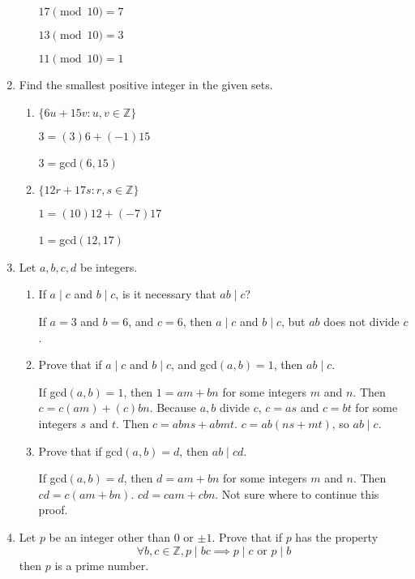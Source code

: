 \documentclass{article}
\begin{document}
\begin{enumerate}
\begin{enumerate}
        $17 \pmod 10 = 7$

        $13 \pmod 10 = 3$

        $11 \pmod 10 = 1$

    \end{enumerate}

    \item Find the smallest positive integer in the given sets.
    \begin{enumerate}
        \item $\{ 6u + 15v \colon u,v\in\mathbb{Z} \}$
        
        $3 = (3)6 + (-1)15$
        
        $3 = $gcd$(6,15)$
        \item $\{ 12r + 17s \colon r,s\in\mathbb{Z} \}$
        
        $1 = (10)12 + (-7)17$

        $1 = $gcd$(12,17)$
    \end{enumerate}
    

    \item Let $a,b,c,d$ be integers.
    \begin{enumerate}
        \item If $a\mid c$ and $b\mid c$, is it necessary that $ab\mid c$? 
        
        If $a = 3$ and $b = 6$, and $c = 6$, then $a\mid c$ and $b\mid c$, but $ab$ does not divide $c$.

        \item Prove that if $a\mid c$ and $b\mid c$, and gcd$(a,b) = 1$, then $ab\mid c$.
        
        If gcd$(a,b) = 1$, then $1 = am + bn$ for some integers $m$ and $n$. Then $c = c(am) + (c)bn$.
        Because $a,b$ divide $c$, $c = as$ and $c = bt$ for some integers $s$ and $t$. Then $c = abns + abmt$. $c = ab(ns+mt)$, so $ab\mid c$.

        \item Prove that if gcd$(a,b) = d$, then $ab\mid cd$.
        
        If gcd$(a,b) = d$, then $d = am + bn$ for some integers $m$ and $n$. Then $cd = c(am+bn)$.
        $cd = cam + cbn$. Not sure where to continue this proof.
    \end{enumerate}

    \item Let $p$ be an integer other than $0$ or $\pm1$. Prove that if $p$ has the property
    \begin{equation*}
        \forall b,c\in\mathbb{Z}, p\mid bc \implies p\mid c \text{ or } p\mid b
    \end{equation*}
    then $p$ is a prime number.


\end{enumerate}
\end{document}
